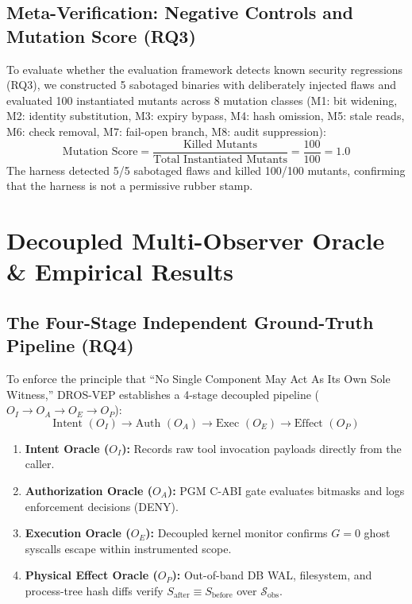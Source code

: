 \documentclass[conference]{IEEEtran}
\begin{document}
\subsection{Meta-Verification: Negative Controls and Mutation Score (RQ3)}
To evaluate whether the evaluation framework detects known security regressions (RQ3), we constructed 5 sabotaged binaries with deliberately injected flaws and evaluated 100 instantiated mutants across 8 mutation classes (M1: bit widening, M2: identity substitution, M3: expiry bypass, M4: hash omission, M5: stale reads, M6: check removal, M7: fail-open branch, M8: audit suppression):
\begin{equation}
\text{Mutation Score} = \frac{\text{Killed Mutants}}{\text{Total Instantiated Mutants}} = \frac{100}{100} = 1.0
\end{equation}
The harness detected 5/5 sabotaged flaws and killed 100/100 mutants, confirming that the harness is not a permissive rubber stamp.

\section{Decoupled Multi-Observer Oracle \& Empirical Results}

\subsection{The Four-Stage Independent Ground-Truth Pipeline (RQ4)}
To enforce the principle that ``No Single Component May Act As Its Own Sole Witness,'' DROS-VEP establishes a 4-stage decoupled pipeline ($O_I \rightarrow O_A \rightarrow O_E \rightarrow O_P$):
\begin{equation}
\text{Intent } (O_I) \longrightarrow \text{Auth } (O_A) \longrightarrow \text{Exec } (O_E) \longrightarrow \text{Effect } (O_P)
\end{equation}
\begin{enumerate}
    \item \textbf{Intent Oracle ($O_I$):} Records raw tool invocation payloads directly from the caller.
    \item \textbf{Authorization Oracle ($O_A$):} PGM C-ABI gate evaluates bitmasks and logs enforcement decisions (DENY).
    \item \textbf{Execution Oracle ($O_E$):} Decoupled kernel monitor confirms $G = 0$ ghost syscalls escape within instrumented scope.
    \item \textbf{Physical Effect Oracle ($O_P$):} Out-of-band DB WAL, filesystem, and process-tree hash diffs verify $S_{\text{after}} \equiv S_{\text{before}}$ over $\mathcal{S}_{\text{obs}}$.
\end{enumerate}
\end{document}

